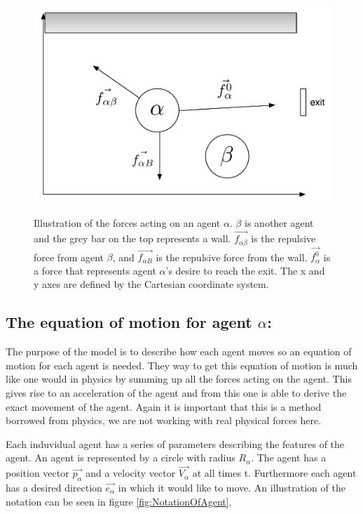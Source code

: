 \begin{figure}[ht]
    \centering
    {\includegraphics[scale=0.45]{Figures/ForceModel.pdf}} \caption[Notation 
    of forces acting on an agent]{Illustration of the forces acting on an 
    agent $\alpha $. $ \beta $ is another agent and the grey bar on the top 
    represents a wall. $ \overrightarrow{f_{\alpha\beta}} $ is the repulsive force from 
    agent $ \beta $, and $ \overrightarrow{f_{\alpha B}} $ is the repulsive force from 
    the wall. $ \overrightarrow{f^{0}_{\alpha}} $ is a force that represents agent $ 
    \alpha $'s desire to reach the exit.  The x and y axes are defined by the 
    Cartesian coordinate system.}
    \label{ForceModel}
\end{figure}

\subsection{The equation of motion for agent $ \alpha $:}
The purpose of the model is to describe how each agent moves so an equation of 
motion for each agent is needed. They way to get this equation of motion is 
much like one would in physics by summing up all the forces acting on the 
agent. This gives rise to an acceleration of the agent and from this one is 
able to derive the exact movement of the agent. Again it is important that 
this is a method borrowed from physics, we are not working with real physical 
forces here.

Each induvidual agent has a series of parameters describing the features of 
the agent. An agent is represented by a circle with radius $R_{\alpha}$. The 
agent has a position vector $\overrightarrow{p_{\alpha}}$ and a velocity vector $\overrightarrow{V_{\alpha}}$ at 
all times t. Furthermore each agent has a desired direction $\overrightarrow{e_{\alpha}}$ 
in which it would like to move. An illustration of the notation can be seen in 
figure \ref{fig:NotationOfAgent}.

